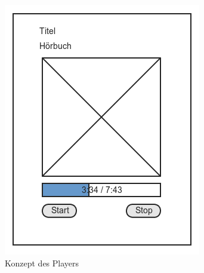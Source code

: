 \begin{figure}[ht]
\begin{minipage}[b]{0.45\linewidth}
\centering
\includegraphics[width=\textwidth]{images/playerkomp}
\caption{Konzept des Players}
\label{playerkomp}
\end{minipage}
\hspace{0.5cm}
\begin{minipage}[b]{0.45\linewidth}
\centering

\end{minipage}
\end{figure}

